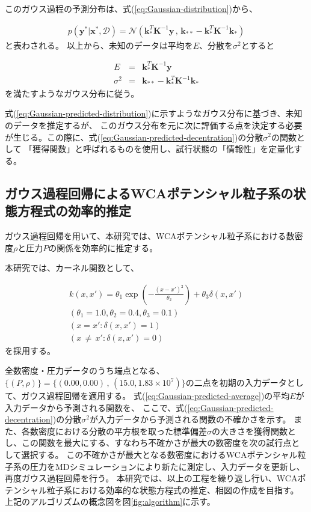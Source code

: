 \documentclass[titlepage]{jsreport}
\begin{document}
{{{このガウス過程の予測分布は、式(\ref{eq:Gaussian-distribution})から、

\large
\begin{eqnarray}
p(\bm{y}^*|\bm{x}^*,\mathcal{D})
={\mathcal{N}}(\bm{k}_*^T\bm{K}^{-1}\bm{y}\,,\,\bm{k}_{**}-\bm{k}_*^T\bm{K}^{-1}\bm{k}_*)  \label{eq:Gaussian-predicted-distribution}
\end{eqnarray}
\normalsize
と表わされる。
以上から、未知のデータは平均を$E$、分散を$\sigma^2$とすると

\large
\begin{eqnarray}
    E&=&\bm{k}_*^T\bm{K}^{-1}\bm{y}\\ \label{eq:Gaussian-predicted-average}
    \sigma^2&=&\bm{k}_{**}-\bm{k}_*^T\bm{K}^{-1}\bm{k}_* \label{eq:Gaussian-predicted-decentration}
\end{eqnarray}
\normalsize
を満たすようなガウス分布に従う\cite{Gauss-machine-learning}。

式(\ref{eq:Gaussian-predicted-distribution})に示すようなガウス分布に基づき、未知のデータを推定するが、
このガウス分布を元に次に評価する点を決定する必要が生じる。この際に、式(\ref{eq:Gaussian-predicted-decentration})の分散$\sigma^2$の関数として
「獲得関数」と呼ばれるものを使用し、試行状態の「情報性」を定量化する\cite{acquisition-function}。


\subsection{ガウス過程回帰によるWCAポテンシャル粒子系の状態方程式の効率的推定}\label{method-subsec:Gaussian-estimation}
ガウス過程回帰を用いて、本研究では、WCAポテンシャル粒子系における数密度$\rho$と圧力$P$の関係を効率的に推定する。

本研究では、カーネル関数として、

\large
\begin{eqnarray}
    k(x,x')=\theta_1\exp\left(-\frac{(x-x')^2}{\theta_2}\right)+\theta_3\delta(x,x')\\ \label{eq:Gauss-kernel}
    (\theta_1=1.0,\theta_2=0.4,\theta_3=0.1) \nonumber \\ 
    (x=x':\delta(x,x')=1) \nonumber \\
    (x\,{\neq}\,x':\delta(x,x')=0) \nonumber
\end{eqnarray}
\normalsize
を採用する\cite{Gauss-machine-learning}。

全数密度・圧力データのうち端点となる、
$\{(P,\rho)\}=\{(0.00,0.00)\,,\,(15.0,1.83×10^7)\}$の二点を初期の入力データとして、ガウス過程回帰を適用する。
式(\ref{eq:Gaussian-predicted-average})の平均$E$が入力データから予測される関数を、
ここで、式(\ref{eq:Gaussian-predicted-decentration})の分散$\sigma^2$が入力データから予測される関数の不確かさを示す。
また、各数密度における分散の平方根を取った標準偏差$\sigma$の大きさを獲得関数とし、この関数を最大にする、すなわち不確かさが最大の数密度を次の試行点として選択する。
この不確かさが最大となる数密度におけるWCAポテンシャル粒子系の圧力をMDシミュレーションにより新たに測定し、入力データを更新し、再度ガウス過程回帰を行う。
本研究では、以上の工程を繰り返し行い、WCAポテンシャル粒子系における効率的な状態方程式の推定、相図の作成を目指す。
上記のアルゴリズムの概念図を図\ref{fig:algorithm}に示す。

}}}
\end{document}
